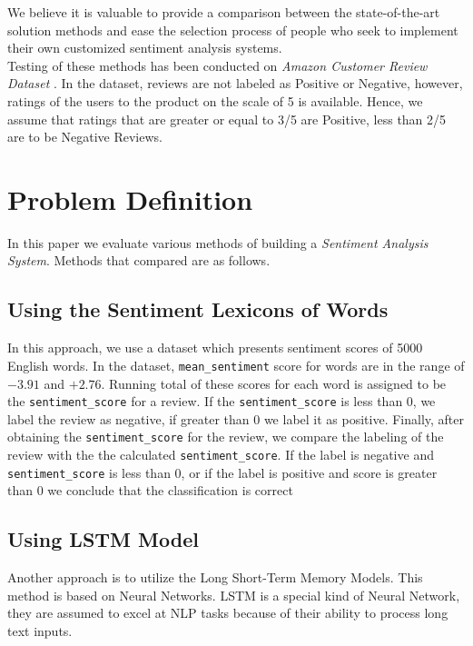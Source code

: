 \documentclass[11pt,a4paper]{article}
\begin{document}
We believe it is valuable to provide a comparison between the state-of-the-art solution methods and ease the selection process of people who seek to implement their own customized sentiment analysis systems. \\

 Testing of these methods has been conducted on \textit{Amazon Customer Review Dataset} \cite{He_2016, mcauley2015imagebased}. In the dataset, reviews are not labeled as Positive or Negative, however, ratings of the users to the product on the scale of 5 is available. Hence, we assume that ratings that are greater or equal to 3/5 are Positive, less than 2/5 are to be Negative Reviews.
 
\section{Problem Definition}
In this paper we evaluate various methods of building a \textit{Sentiment Analysis System}. Methods that compared are as follows.
\subsection{Using the Sentiment Lexicons of Words}
	In this approach, we use a dataset which presents sentiment scores of 5000 English words. In the dataset, \texttt{mean\_sentiment} score for words are in the range of $-3.91$ and $+2.76$. Running total of these scores for each word is assigned to be the \texttt{sentiment\_score} for a review. If the \texttt{sentiment\_score} is less than 0, we label the review as negative, if greater than 0 we label it as positive. Finally, after obtaining the \texttt{sentiment\_score} for the review, we compare the labeling of the review with the the calculated \texttt{sentiment\_score}. If the label is negative and \texttt{sentiment\_score} is less than 0, or if the label is positive and score is greater than 0 we conclude that the classification is correct 
\subsection{Using LSTM Model}
	Another approach is to utilize the Long Short-Term Memory Models. 	This method is based on Neural Networks. LSTM is a special kind of Neural Network, they are assumed to excel at NLP tasks because of their ability to process long text inputs.  
\end{document}
